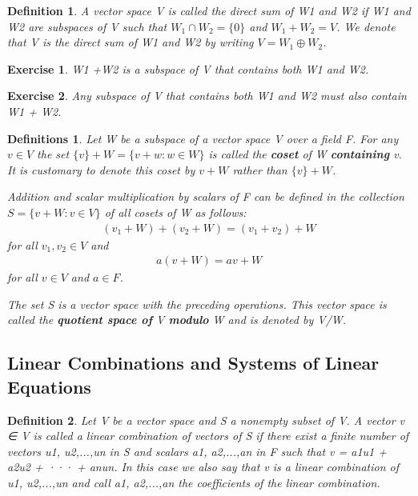 \documentclass{article}
\newcommand{\bd}[1]{\textbf{#1}}
\theoremstyle{plain}
\newtheorem*{definition1}{Definition}
\newtheorem*{definitions}{Definitions}
\newtheorem*{exercise}{Exercise}
\theoremstyle{plain} %
\begin{document}
\begin{definition1}
A vector space V is called the direct sum of W1 and W2 if W1 and W2 are subspaces of V such that $W_1 \cap W_2 = \{0 \}$ and $W_1 + W_2 = V$. We denote that V is the direct sum of W1 and W2 by writing $V = W_1 \oplus W_2$.
\end{definition1}

\begin{exercise}
W1 +W2 is a subspace of V that contains both W1 and W2.
\end{exercise}

\begin{exercise}
Any subspace of V that contains both W1 and W2 must also contain W1 + W2.
\end{exercise}

\begin{definitions}
Let W be a subspace of a vector space V over a field F. For any $v \in V$ the set $\{v\}+W = \{v+w: w \in W\}$ is called the \bd{coset} of W \bd{containing} v. It is customary to denote this coset by $v + W$ rather than $\{v\} + W$.

Addition and scalar multiplication by scalars of F can be defined in the collection $S = \{v + W: v \in V\}$ of all cosets of W as follows:
\begin{align}
(v_1 + W)+(v_2 + W)=(v_1 + v_2) + W
\end{align}
for all $v_1, v_2 \in V$ and
\begin{align}
a(v + W) = av + W
\end{align}
for all $v \in V$ and $a \in F$.

The set S is a vector space with the preceding operations. This vector space is called the \bd{quotient space of} V \bd{modulo} W and is denoted by V/W.
\end{definitions}

\subsection{Linear Combinations and Systems of Linear Equations}

\begin{definition1}
Let V be a vector space and S a nonempty subset of V. A vector v ∈ V is called a linear combination of vectors of S if there exist a finite number of vectors u1, u2,...,un in S and scalars a1, a2,...,an in F such that v = a1u1 + a2u2 + ··· + anun. In this case we also say that v is a linear combination of u1, u2,...,un and call a1, a2,...,an the coefficients of the linear combination.
\end{definition1}
\end{document}
